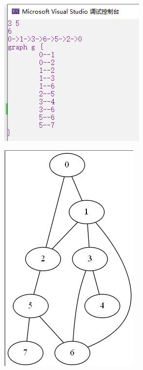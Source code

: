 \documentclass[UTF8]{article}
\begin{document}
	\begin{figure}[H]
		\begin{minipage}[H]{0.48\linewidth}
			\centering
			\includegraphics[scale=0.45]{output11.jpg}
			\label{output11}
		\end{minipage}
		\qquad
		\begin{minipage}[H]{0.48\linewidth}
			\centering
			\includegraphics[scale=0.45]{output111.jpg}
			\label{output111}
		\end{minipage}
	\end{figure}
\end{document}
